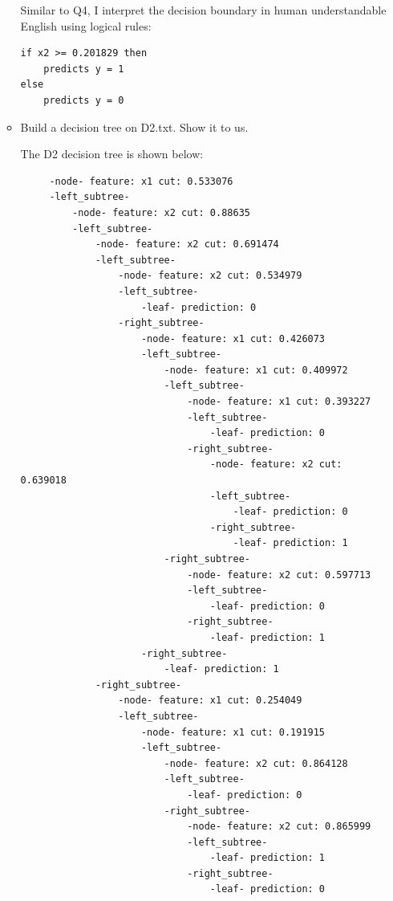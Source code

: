 \documentclass[a4paper]{article}
\theoremstyle{definition}
\begin{document}
\begin{enumerate}
\begin{itemize}
{\color{blue}
Similar to Q4, I interpret the decision boundary in human understandable English using logical rules:
\begin{verbatim}
if x2 >= 0.201829 then
    predicts y = 1
else
    predicts y = 0
\end{verbatim}
}
  \item Build a decision tree on D2.txt.  Show it to us.
  
{\color{blue}
The D2 decision tree is shown below:
\begin{verbatim}
     -node- feature: x1 cut: 0.533076
     -left_subtree-
         -node- feature: x2 cut: 0.88635
         -left_subtree-
             -node- feature: x2 cut: 0.691474
             -left_subtree-
                 -node- feature: x2 cut: 0.534979
                 -left_subtree-
                     -leaf- prediction: 0
                 -right_subtree-
                     -node- feature: x1 cut: 0.426073
                     -left_subtree-
                         -node- feature: x1 cut: 0.409972
                         -left_subtree-
                             -node- feature: x1 cut: 0.393227
                             -left_subtree-
                                 -leaf- prediction: 0
                             -right_subtree-
                                 -node- feature: x2 cut: 0.639018
                                 -left_subtree-
                                     -leaf- prediction: 0
                                 -right_subtree-
                                     -leaf- prediction: 1
                         -right_subtree-
                             -node- feature: x2 cut: 0.597713
                             -left_subtree-
                                 -leaf- prediction: 0
                             -right_subtree-
                                 -leaf- prediction: 1
                     -right_subtree-
                         -leaf- prediction: 1
             -right_subtree-
                 -node- feature: x1 cut: 0.254049
                 -left_subtree-
                     -node- feature: x1 cut: 0.191915
                     -left_subtree-
                         -node- feature: x2 cut: 0.864128
                         -left_subtree-
                             -leaf- prediction: 0
                         -right_subtree-
                             -node- feature: x2 cut: 0.865999
                             -left_subtree-
                                 -leaf- prediction: 1
                             -right_subtree-
                                 -leaf- prediction: 0

\end{verbatim}}
\end{itemize}
\end{enumerate}
\end{document}
